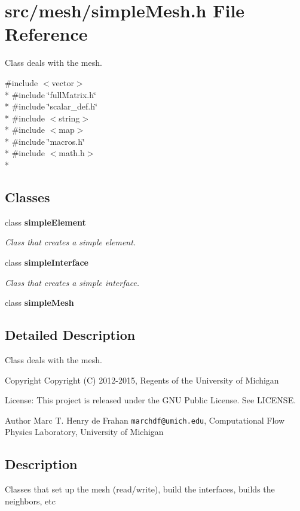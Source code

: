 \section{src/mesh/simple\-Mesh.h File Reference}
\label{simpleMesh_8h}


Class deals with the mesh.  


{\ttfamily \#include $<$vector$>$}\\*
{\ttfamily \#include \char`\"{}full\-Matrix.\-h\char`\"{}}\\*
{\ttfamily \#include \char`\"{}scalar\-\_\-def.\-h\char`\"{}}\\*
{\ttfamily \#include $<$string$>$}\\*
{\ttfamily \#include $<$map$>$}\\*
{\ttfamily \#include \char`\"{}macros.\-h\char`\"{}}\\*
{\ttfamily \#include $<$math.\-h$>$}\\*
\subsection*{Classes}
\begin{DoxyCompactItemize}
\item 
class {\bf simple\-Element}
\begin{DoxyCompactList}\small\item\em Class that creates a simple element. \end{DoxyCompactList}\item 
class {\bf simple\-Interface}
\begin{DoxyCompactList}\small\item\em Class that creates a simple interface. \end{DoxyCompactList}\item 
class {\bf simple\-Mesh}
\end{DoxyCompactItemize}


\subsection{Detailed Description}
Class deals with the mesh. \begin{DoxyCopyright}{Copyright}
Copyright (C) 2012-\/2015, Regents of the University of Michigan 
\end{DoxyCopyright}
\begin{DoxyParagraph}{License\-:}
This project is released under the G\-N\-U Public License. See L\-I\-C\-E\-N\-S\-E. 
\end{DoxyParagraph}
\begin{DoxyAuthor}{Author}
Marc T. Henry de Frahan {\tt marchdf@umich.\-edu}, Computational Flow Physics Laboratory, University of Michigan 
\end{DoxyAuthor}
\subsection{Description}\label{scalar__def_8h_Description}
Classes that set up the mesh (read/write), build the interfaces, builds the neighbors, etc 